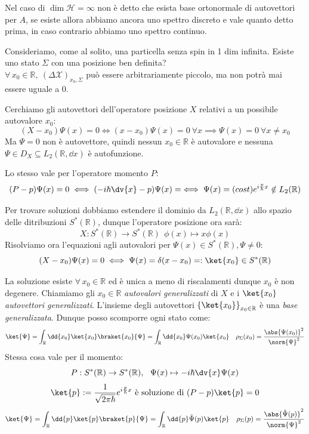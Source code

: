 Nel caso di \(\dim \mathcal{H}= \infty\) non è detto che esista base ortonormale di autovettori per \(A\),
se esiste allora abbiamo ancora uno spettro discreto e vale quanto detto prima, in caso contrario abbiamo uno spettro continuo.

\begin{example}
    Consideriamo, come al solito, una particella senza spin in 1 dim infinita. Esiste uno stato \(\Sigma\) con una posizione ben definita?\\
    \(\forall\, x_0 \in \mathbb{R}, \ (\Delta \mathcal{X})_{x_0, \Sigma}\) può essere arbitrariamente piccolo, ma non potrà mai essere uguale a \(0\).
\end{example}

Cerchiamo gli autovettori dell'operatore posizione \(X\) relativi a un possibile autovalore \(x_0\):
\[
    (X-x_0)\Psi(x)= 0 \iff (x-x_0)\Psi(x)= 0 \ \forall x \implies \Psi(x) = 0 \ \forall x \neq x_0
\]
Ma \(\Psi= 0\) non è autovettore, quindi nessun \(x_0 \in \mathbb{R}\) è autovalore e nessuna \(\Psi \in D_X\subseteq L_2(\mathbb{R},\dd{x})\) è autofunzione.

Lo stesso vale per l'operatore momento \(P\):
\[
    (P-p)\Psi(x)=0 \iff ( -i\hbar\dv{x} - p ) \Psi(x) = \iff \Psi(x)= (cost)e^{i\frac{p}{\hbar}x} \notin L_2(\mathbb{R})
\]

Per trovare soluzioni dobbiamo estendere il dominio da \(L_2(\mathbb{R},\dd{x})\) allo spazio delle ditribuzioni \(S^*(\mathbb{R})\), 
dunque l'operatore posizione ora sarà: 
\[
    X: S^*(\mathbb{R})\to S^*(\mathbb{R}) \ \ \phi(x)\mapsto x\phi(x)
\]
Risolviamo ora l'equazioni agli autovalori per \(\Psi(x) \in S^*(\mathbb{R}), \Psi\neq 0 \):
\begin{equation}
    (X-x_0)\Psi(x)= 0 \iff \Psi(x)= \delta(x-x_0) = : \ket{x_0} \in S^*(\mathbb{R})
\end{equation}

La soluzione esiste \(\forall\, x_0 \in \mathbb{R}\) ed è unica a meno di riscalamenti dunque \(x_0\) è non degenere.
Chiamiamo gli \(x_0 \in \mathbb{R}\) \textit{autovalori generalizzati} di \(X\) e  i \(\ket{x_0}\)  \textit{autovettori generalizzati}. 
L'insieme degli autovettori \(\left\{ \ket{x_0} \right\}_{x_0 \in \mathbb{R}}\) è una \textit{base generalizzata}. Dunque posso scomporre ogni stato come:
\[
    \ket{\Psi}= \int_{\mathbb{R}}\dd{x_0} \ket{x_0} \braket{x_0}{\Psi} = \int_\mathbb{R} \dd{x_0} \Psi(x_0) \ket{x_0} 
    \quad \rho_\Sigma(x_0) = \frac{\abs{\Psi(x_0)}^2}{\norm{\Psi}^2}
\]
Stessa cosa vale per il momento:
\[
    P: S^*(\mathbb{R})\to S^*(\mathbb{R}),\ \  \Psi(x) \mapsto -i\hbar \dv{x}\Psi(x)
\]
\[
    \ket{p}:= \frac{1}{\sqrt{2\pi \hbar}}e ^{i\frac{p}{\hbar}x} \text{ è soluzione di }  (P-p)\ket{p}=0
\]
\[
    \ket{\Psi} = \int_\mathbb{R} \dd{p} \ket{p} \braket{p}{\Psi}= \int_\mathbb{R} \dd{p} \tilde{\Psi}(p)\ket{p} \quad 
    \rho_\Sigma(p)= \frac{\abs{\tilde{\Psi}(p)}^2}{\norm{\Psi}^2}
\]

